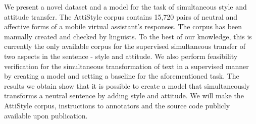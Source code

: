 We present a novel dataset and a model for the task of simultaneous style and attitude transfer. The AttiStyle corpus contains 15,720 pairs of neutral and affective forms of a mobile virtual assistant's responses. The corpus has been manually created and checked by linguists. To the best of our knowledge, this is currently the only available corpus for the supervised simultaneous transfer of two aspects in the sentence - style and attitude. We also perform feasibility verification for the simultaneous transformation of text in a supervised manner by creating a model and setting a baseline for the aforementioned task. The results we obtain show that it is possible to create a model that simultaneously transforms a neutral sentence by adding style and attitude. We will make the AttiStyle corpus, instructions to annotators and the source code publicly available upon publication.

